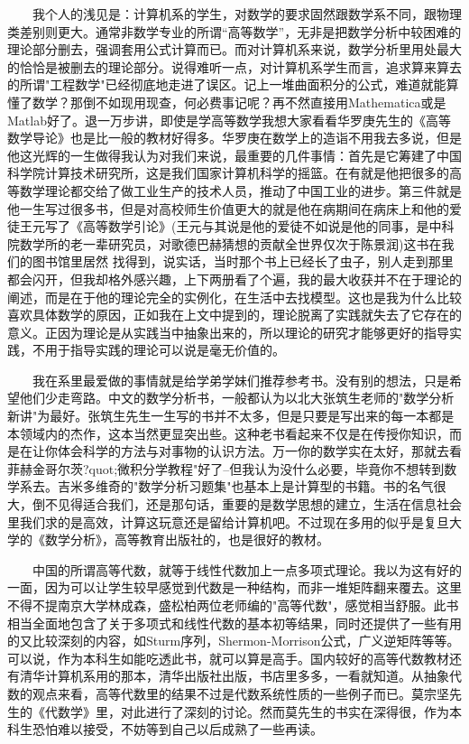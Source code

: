 　　我个人的浅见是：计算机系的学生，对数学的要求固然跟数学系不同，跟物理类差别则更大。通常非数学专业的所谓“高等数学”，无非是把数学分析中较困难的理论部分删去，强调套用公式计算而已。而对计算机系来说，数学分析里用处最大的恰恰是被删去的理论部分。说得难听一点，对计算机系学生而言，追求算来算去的所谓"工程数学"已经彻底地走进了误区。记上一堆曲面积分的公式，难道就能算懂了数学？那倒不如现用现查，何必费事记呢？再不然直接用Mathematica或是Matlab好了。退一万步讲，即使是学高等数学我想大家看看华罗庚先生的《高等数学导论》也是比一般的教材好得多。华罗庚在数学上的造诣不用我去多说，但是他这光辉的一生做得我认为对我们来说，最重要的几件事情：首先是它筹建了中国科学院计算技术研究所，这是我们国家计算机科学的摇篮。在有就是他把很多的高等数学理论都交给了做工业生产的技术人员，推动了中国工业的进步。第三件就是他一生写过很多书，但是对高校师生价值更大的就是他在病期间在病床上和他的爱徒王元写了《高等数学引论》(王元与其说是他的爱徒不如说是他的同事，是中科院数学所的老一辈研究员，对歌德巴赫猜想的贡献全世界仅次于陈景润)这书在我们的图书馆里居然 
找得到，说实话，当时那个书上已经长了虫子，别人走到那里都会闪开，但我却格外感兴趣，上下两册看了个遍，我的最大收获并不在于理论的阐述，而是在于他的理论完全的实例化，在生活中去找模型。这也是我为什么比较喜欢具体数学的原因，正如我在上文中提到的，理论脱离了实践就失去了它存在的意义。正因为理论是从实践当中抽象出来的，所以理论的研究才能够更好的指导实践，不用于指导实践的理论可以说是毫无价值的。 

　　我在系里最爱做的事情就是给学弟学妹们推荐参考书。没有别的想法，只是希望他们少走弯路。中文的数学分析书，一般都认为以北大张筑生老师的"数学分析新讲"为最好。张筑生先生一生写的书并不太多，但是只要是写出来的每一本都是本领域内的杰作，这本当然更显突出些。这种老书看起来不仅是在传授你知识，而是在让你体会科学的方法与对事物的认识方法。万一你的数学实在太好，那就去看菲赫金哥尔茨?quot;微积分学教程"好了--但我认为没什么必要，毕竟你不想转到数学系去。吉米多维奇的"数学分析习题集"也基本上是计算型的书籍。书的名气很大，倒不见得适合我们，还是那句话，重要的是数学思想的建立，生活在信息社会里我们求的是高效，计算这玩意还是留给计算机吧。不过现在多用的似乎是复旦大学的《数学分析》，高等教育出版社的，也是很好的教材。 

　　中国的所谓高等代数，就等于线性代数加上一点多项式理论。我以为这有好的一面，因为可以让学生较早感觉到代数是一种结构，而非一堆矩阵翻来覆去。这里不得不提南京大学林成森，盛松柏两位老师编的"高等代数"，感觉相当舒服。此书相当全面地包含了关于多项式和线性代数的基本初等结果，同时还提供了一些有用的又比较深刻的内容，如Sturm序列，Shermon-Morrison公式，广义逆矩阵等等。可以说，作为本科生如能吃透此书，就可以算是高手。国内较好的高等代数教材还有清华计算机系用的那本，清华出版社出版，书店里多多，一看就知道。从抽象代数的观点来看，高等代数里的结果不过是代数系统性质的一些例子而已。莫宗坚先生的《代数学》里，对此进行了深刻的讨论。然而莫先生的书实在深得很，作为本科生恐怕难以接受，不妨等到自己以后成熟了一些再读。 

